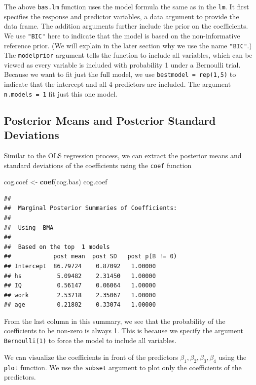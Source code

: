 \documentclass[]{book}
\newenvironment{Shaded}{\begin{snugshade}}{\end{snugshade}}
\newcommand{\KeywordTok}[1]{\textcolor[rgb]{0.13,0.29,0.53}{\textbf{{#1}}}}
\newcommand{\StringTok}[1]{\textcolor[rgb]{0.31,0.60,0.02}{{#1}}}
\newcommand{\NormalTok}[1]{{#1}}
\theoremstyle{definition}
\theoremstyle{definition}
\theoremstyle{definition}
\theoremstyle{remark}
\begin{document}
The above \texttt{bas.lm} function uses the model formula the same as in
the \texttt{lm}. It first specifies the response and predictor
variables, a data argument to provide the data frame. The addition
arguments further include the prior on the coefficients. We use
\texttt{"BIC"} here to indicate that the model is based on the
non-informative reference prior. (We will explain in the later section
why we use the name \texttt{"BIC"}.) The \texttt{modelprior} argument
tells the function to include all variables, which can be viewed as
every variable is included with probability 1 under a Bernoulli trial.
Because we want to fit just the full model, we use
\texttt{bestmodel\ =\ rep(1,5)} to indicate that the intercept and all 4
predictors are included. The argument \texttt{n.models\ =\ 1} fit just
this one model.

\subsection{Posterior Means and Posterior Standard
Deviations}\label{posterior-means-and-posterior-standard-deviations}

Similar to the OLS regression process, we can extract the posterior
means and standard deviations of the coefficients using the
\texttt{coef} function

\begin{Shaded}
\begin{Highlighting}[]
\NormalTok{cog.coef <-}\StringTok{ }\KeywordTok{coef}\NormalTok{(cog.bas)}
\NormalTok{cog.coef}
\end{Highlighting}
\end{Shaded}

\begin{verbatim}
## 
##  Marginal Posterior Summaries of Coefficients: 
## 
##  Using  BMA 
## 
##  Based on the top  1 models 
##            post mean  post SD   post p(B != 0)
## Intercept  86.79724    0.87092   1.00000      
## hs          5.09482    2.31450   1.00000      
## IQ          0.56147    0.06064   1.00000      
## work        2.53718    2.35067   1.00000      
## age         0.21802    0.33074   1.00000
\end{verbatim}

From the last column in this summary, we see that the probability of the
coefficients to be non-zero is always 1. This is because we specify the
argument \texttt{Bernoulli(1)} to force the model to include all
variables.

We can visualize the coefficients in front of the predictors
\(\beta_1,\beta_2, \beta_3, \beta_4\) using the \texttt{plot} function.
We use the \texttt{subset} argument to plot only the coefficients of the
predictors.
\end{document}
